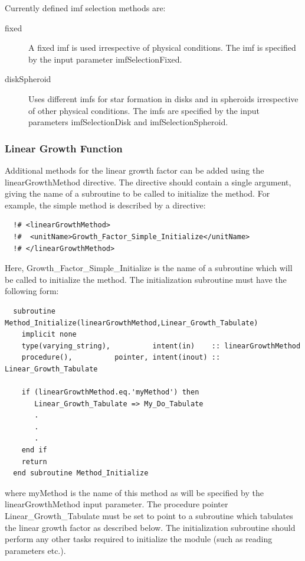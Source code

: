 Currently defined \gls{imf} selection methods are:
\begin{description}
 \item [{\normalfont \ttfamily fixed}] A fixed \gls{imf} is used irrespective of physical conditions. The \gls{imf} is specified by the input parameter {\normalfont \ttfamily imfSelectionFixed}.
 \item [{\normalfont \ttfamily diskSpheroid}] Uses different {\gls{imf}}s for star formation in disks and in spheroids irrespective of other physical conditions. The {\gls{imf}}s are specified by the input parameters {\normalfont \ttfamily imfSelectionDisk} and {\normalfont \ttfamily imfSelectionSpheroid}.
\end{description}

\subsubsection{Linear Growth Function}

Additional methods for the linear growth factor can be added using the {\normalfont \ttfamily linearGrowthMethod} directive. The directive should contain a single argument, giving the name of a subroutine to be called to initialize the method. For example, the {\normalfont \ttfamily simple} method is described by a directive:
\begin{verbatim}
  !# <linearGrowthMethod>
  !#  <unitName>Growth_Factor_Simple_Initialize</unitName>
  !# </linearGrowthMethod>
\end{verbatim}
Here, {\normalfont \ttfamily Growth\_Factor\_Simple\_Initialize} is the name of a subroutine which will be called to initialize the method. The initialization subroutine must have the following form:
\begin{verbatim}
  subroutine Method_Initialize(linearGrowthMethod,Linear_Growth_Tabulate)
    implicit none
    type(varying_string),          intent(in)    :: linearGrowthMethod
    procedure(),          pointer, intent(inout) :: Linear_Growth_Tabulate
    
    if (linearGrowthMethod.eq.'myMethod') then
       Linear_Growth_Tabulate => My_Do_Tabulate
       .
       .
       .
    end if
    return
  end subroutine Method_Initialize
\end{verbatim}
where {\normalfont \ttfamily myMethod} is the name of this method as will be specified by the {\normalfont \ttfamily linearGrowthMethod} input parameter. The procedure pointer {\normalfont \ttfamily Linear\_Growth\_Tabulate} must be set to point to a subroutine which tabulates the linear growth factor as described below. The initialization subroutine should perform any other tasks required to initialize the module (such as reading parameters etc.).

